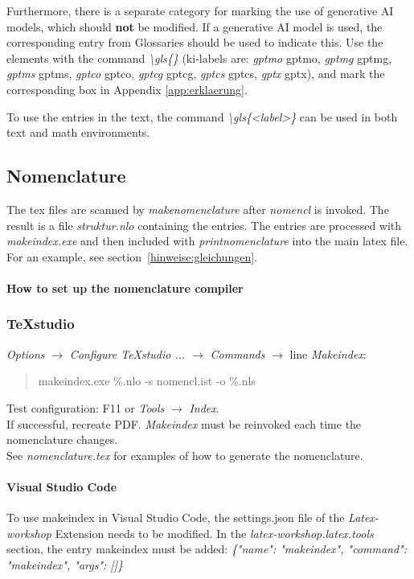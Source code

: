 Furthermore, there is a separate category for marking the use of generative AI models, which should \textbf{not} be modified.
If a generative AI model is used, the corresponding entry from Glossaries should be used to indicate this.
Use the elements with the command \textit{\textbackslash gls\{<ki-label>\}} (ki-labels are: \textit{gptmo} \gls{gptmo}, \textit{gptmg} \gls{gptmg}, \textit{gptms} \gls{gptms}, \textit{gptco} \gls{gptco}, \textit{gptcg} \gls{gptcg}, \textit{gptcs} \gls{gptcs}, \textit{gptx} \gls{gptx}), and mark the corresponding box in Appendix \ref{app:erklaerung}.

To use the entries in the text, the command \textit{\textbackslash gls\{<label>\}} can be used in both text and math environments.


\subsection*{Nomenclature}
The tex files are scanned by \textit{makenomenclature} after \textit{nomencl} is invoked.
The result is a file \textit{struktur.nlo} containing the entries.
The entries are processed with \textit{makeindex.exe} and then included with \textit{printnomenclature} into the main latex file.
For an example, see section~\ref{hinweise:gleichungen}.

\paragraph*{How to set up the nomenclature compiler}

\subsubsection{TeXstudio}
\textit{Options} $\rightarrow$ \textit{Configure TeXstudio ...} $\rightarrow$ \textit{Commands} $\rightarrow$ line \textit{Makeindex}:
\begin{quotation}
makeindex.exe \%.nlo -s nomencl.ist -o \%.nls 
\end{quotation}

\noindent Test configuration: F11 or \textit{Tools} $\rightarrow$ \textit{Index}. \\
If successful, recreate PDF. \textit{Makeindex} must be reinvoked each time the nomenclature changes. \\
See \textit{nomenclature.tex} for examples of how to generate the nomenclature.

\paragraph{Visual Studio Code}
To use makeindex in Visual Studio Code, the settings.json file of the \textit{Latex-workshop} Extension needs to be modified. In the \textit{latex-workshop.latex.tools} section, the entry makeindex must be added: \textit{ \{"name": "makeindex", "command": "makeindex", "{args}": []\} }

